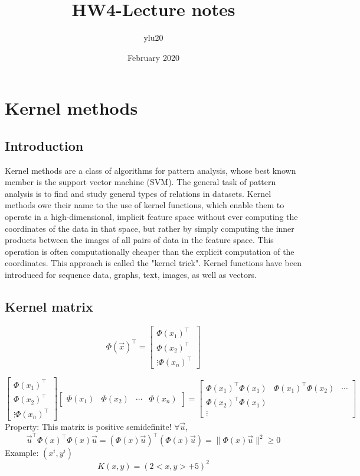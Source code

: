 \documentclass{article}
\title{HW4-Lecture notes}
\author{ylu20 }
\date{February 2020}
\begin{document}
\maketitle

\section{Kernel methods}
\subsection{Introduction}
Kernel methods are a class of algorithms for pattern analysis, whose best known member is the support vector machine (SVM). The general task of pattern analysis is to find and study general types of relations in datasets. Kernel methods owe their name to the use of kernel functions, which enable them to operate in a high-dimensional, implicit feature space without ever computing the coordinates of the data in that space, but rather by simply computing the inner products between the images of all pairs of data in the feature space. This operation is often computationally cheaper than the explicit computation of the coordinates. This approach is called the "kernel trick". Kernel functions have been introduced for sequence data, graphs, text, images, as well as vectors.
\subsection{Kernel matrix}
\begin{equation}
\Phi(\vec{x})^\top = 
\begin{bmatrix}
\Phi(x_{1})^\top\\
\Phi(x_{2})^\top\\
\vdots
\Phi(x_{n})^\top
\end{bmatrix}
\end{equation}

\begin{equation}
\begin{bmatrix}
\Phi(x_{1})^\top\\
\Phi(x_{2})^\top\\
\vdots
\Phi(x_{n})^\top
\end{bmatrix}
\begin{bmatrix}
\Phi(x_{1}) & \Phi(x_{2}) & \cdots & \Phi(x_{n})
\end{bmatrix}=
\begin{bmatrix}
\Phi(x_{1})^\top\Phi(x_{1}) & \Phi(x_{1})^\top\Phi(x_{2}) & \cdots \\
\Phi(x_{2})^\top\Phi(x_{1})\\
\vdots
\end{bmatrix}
\end{equation}
Property: This matrix is positive semidefinite! $\forall \vec{u}$, 
\begin{equation}
\vec{u}^\top\Phi(x)^\top\Phi(x)\vec{u} = (\Phi(x)\vec{u})^\top(\Phi(x)\vec{u}) = \|\Phi(x)\vec{u}\|^2 \geq 0
\end{equation}
Example: $(x^{i}, y^{i})$
\begin{equation}
K(x,y) = (2<x,y> + 5)^2
\end{equation}
\end{document}
